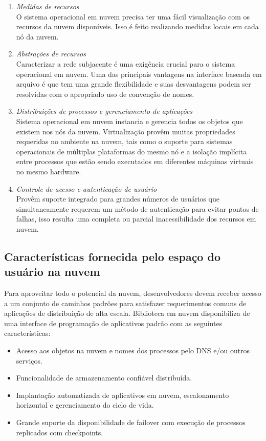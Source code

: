 \documentclass{llncs}
\begin{document}
\begin{enumerate}
\item \emph{Medidas de recursos} \\
O sistema operacional em nuvem precisa ter uma fácil visualização com os recursos da nuvem disponíveis. Isso é feito realizando medidas locais em cada nó da nuvem. \\

\item \emph{Abstrações de recursos} \\
Caracterizar a rede subjacente é uma exigência crucial para o sistema operacional em nuvem. Uma das principais vantagens na interface baseada em arquivo é que tem uma grande flexibilidade e suas desvantagens podem ser resolvidas com o apropriado uso de convenção de nomes.
\item \emph{Distribuições de processos e gerenciamento de aplicações} \\
Sistema operacional em nuvem instancia e gerencia todos os objetos que existem nos nós da nuvem. Virtualização provêm muitas propriedades requeridas no ambiente na nuvem, tais como o suporte para sistemas operacionais de múltiplas plataformas do mesmo nó e a isolação implícita entre processos que estão sendo executados em diferentes máquinas virtuais no mesmo hardware.

\item \emph{Controle de acesso e autenticação de usuário} \\
Provêm suporte integrado para grandes números de usuários que simultaneamente requerem um método de autenticação para evitar pontos de falhas, isso resulta uma completa ou parcial inacessibilidade dos recursos em nuvem.
\end{enumerate}


\subsection{Características fornecida pelo espaço do usuário na nuvem }
Para aproveitar todo o potencial da nuvem, desenvolvedores devem receber acesso a um conjunto de caminhos padrões para satisfazer requerimentos comuns de aplicações de distribuição de alta escala. Biblioteca em nuvem disponibiliza de uma interface de programação de aplicativos padrão com as seguintes características:  
\begin{itemize}
\item Acesso aos objetos na nuvem e nomes dos processos pelo DNS e/ou outros serviços.
\item Funcionalidade de armazenamento confiável distribuída.
\item Implantação automatizada de aplicativos em nuvem, escalonamento horizontal e gerenciamento do ciclo de vida.
\item Grande suporte da disponibilidade de failover com execução de processos replicados com checkpoints.

\end{itemize}
\end{document}
